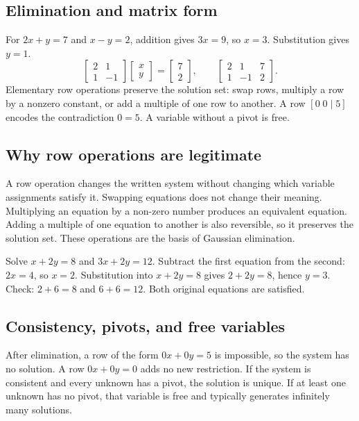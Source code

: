 \documentclass[12pt,a4paper]{article}
\begin{document}
\subsection{Elimination and matrix form}
For $2x+y=7$ and $x-y=2$, addition gives $3x=9$, so $x=3$. Substitution gives $y=1$.
\[
\begin{bmatrix}2&1\\1&-1\end{bmatrix}\begin{bmatrix}x\\y\end{bmatrix}=\begin{bmatrix}7\\2\end{bmatrix},\qquad
\left[\begin{array}{cc|c}2&1&7\\1&-1&2\end{array}\right].
\]
Elementary row operations preserve the solution set: swap rows, multiply a row by a nonzero constant, or add a multiple of one row to another. A row $[0\;0\mid5]$ encodes the contradiction $0=5$. A variable without a pivot is free.
\subsection{Why row operations are legitimate}
A row operation changes the written system without changing which variable assignments satisfy it. Swapping equations does not change their meaning. Multiplying an equation by a non-zero number produces an equivalent equation. Adding a multiple of one equation to another is also reversible, so it preserves the solution set. These operations are the basis of Gaussian elimination.

\begin{exampleBox}Solve $x+2y=8$ and $3x+2y=12$. Subtract the first equation from the second: $2x=4$, so $x=2$. Substitution into $x+2y=8$ gives $2+2y=8$, hence $y=3$. Check: $2+6=8$ and $6+6=12$. Both original equations are satisfied.
\end{exampleBox}

\subsection{Consistency, pivots, and free variables}
After elimination, a row of the form $0x+0y=5$ is impossible, so the system has no solution. A row $0x+0y=0$ adds no new restriction. If the system is consistent and every unknown has a pivot, the solution is unique. If at least one unknown has no pivot, that variable is free and typically generates infinitely many solutions.
\end{document}
